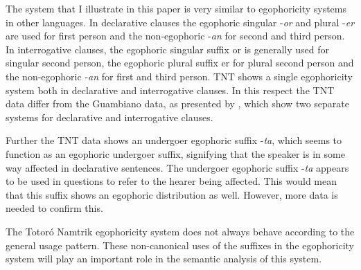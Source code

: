 \documentclass[output=paper]{langsci/langscibook}
\begin{document}
The system that I illustrate in this paper is very similar to egophoricity systems in other languages. In declarative clauses the egophoric singular -\textit{or} and plural -\textit{er} are used for first person and the non-egophoric -\textit{an} for second and third person. In interrogative clauses, the egophoric singular suffix or is generally used for singular second person, the egophoric plural suffix er for plural second person and the non-egophoric -\textit{an} for first and third person. TNT shows a single egophoricity system both in declarative and interrogative clauses. In this respect the TNT data differ from the Guambiano data, as presented by \citet{Norcliffe2018}, which show two separate systems for declarative and interrogative clauses. 

Further the TNT data shows an undergoer egophoric suffix -\textit{ta}, which seems to function as an egophoric undergoer suffix, signifying that the speaker is in some way affected in declarative sentences. The undergoer egophoric suffix -\textit{ta} appears to be used in questions to refer to the hearer being affected. This would mean that this suffix shows an egophoric distribution as well. However, more data is needed to confirm this.

The Totoró Namtrik egophoricity system does not always behave according to the general usage pattern. These non-canonical uses of the suffixes in the egophoricity system will play an important role in the semantic analysis of this system.


  
\end{document}
